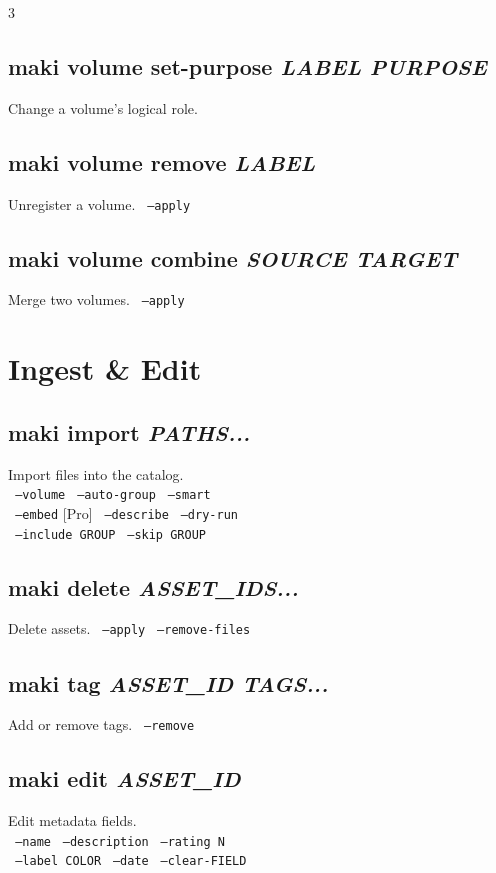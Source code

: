 \documentclass[a4paper,landscape,8pt]{article}
\newcommand{\opt}[1]{\texttt{\scriptsize\color{maki-stone} #1}}
\newcommand{\pro}{\textcolor{maki-teal}{\scriptsize [Pro]}}
\begin{document}
\begin{multicols}{3}
\subsection{maki volume set-purpose \textit{LABEL PURPOSE}}
Change a volume's logical role.

\subsection{maki volume remove \textit{LABEL}}
Unregister a volume. \opt{--apply}

\subsection{maki volume combine \textit{SOURCE TARGET}}
Merge two volumes. \opt{--apply}

\section{Ingest \& Edit}

\subsection{maki import \textit{PATHS...}}
Import files into the catalog. \\
\opt{--volume} \opt{--auto-group} \opt{--smart} \\
\opt{--embed} \pro{} \opt{--describe} \opt{--dry-run} \\
\opt{--include GROUP} \opt{--skip GROUP}

\subsection{maki delete \textit{ASSET\_IDS...}}
Delete assets. \opt{--apply} \opt{--remove-files}

\subsection{maki tag \textit{ASSET\_ID TAGS...}}
Add or remove tags. \opt{--remove}

\subsection{maki edit \textit{ASSET\_ID}}
Edit metadata fields. \\
\opt{--name} \opt{--description} \opt{--rating N} \\
\opt{--label COLOR} \opt{--date} \opt{--clear-FIELD}


\end{multicols}
\end{document}
